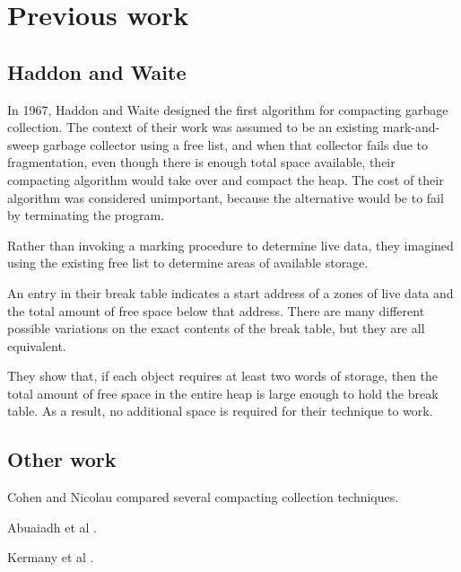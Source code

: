 \section{Previous work}

\subsection{Haddon and Waite}

In 1967, Haddon and Waite \cite{Haddon:1967} designed the first
algorithm for compacting garbage collection.  The context of their
work was assumed to be an existing mark-and-sweep garbage collector
using a free list, and when that collector fails due to fragmentation,
even though there is enough total space available, their compacting
algorithm would take over and compact the heap.  The cost of their
algorithm was considered unimportant, because the alternative would be
to fail by terminating the program.

Rather than invoking a marking procedure to determine live data, they
imagined using the existing free list to determine areas of available
storage. 

An entry in their break table indicates a start address of a zones of
live data and the total amount of free space below that address.
There are many different possible variations on the exact contents of
the break table, but they are all equivalent.

They show that, if each object requires at least two words of storage,
then the total amount of free space in the entire heap is large enough
to hold the break table.  As a result, no additional space is
required for their technique to work.

\subsection{Other work}

Cohen and Nicolau \cite{Cohen:1983:CCA:69575.357226} compared several
compacting collection techniques.

Abuaiadh et al \cite{Abuaiadh:2004:EPH:1028976.1028995}.

Kermany et al \cite{Kermany:2006:CCI:1133981.1134023}.
